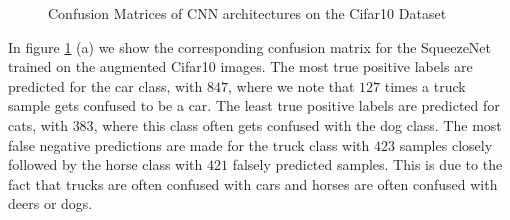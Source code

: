 \documentclass[11pt]{article}
\begin{document}
\begin{figure}
\centering
{}
  \hfill
  \hfill
\caption{Confusion Matrices of CNN architectures on the Cifar10 Dataset}
\label{rescnn::4}
\end{figure}

In figure \ref{rescnn::4} (a) we show the corresponding confusion matrix for the SqueezeNet trained on the augmented Cifar10 images. The most true positive labels are predicted for the car class, with $847$, where we note that $127$ times a truck sample gets confused to be a car. The least true positive labels are predicted for cats, with $383$, where this class often gets confused with the dog class. The most false negative predictions are made for the truck class with $423$ samples closely followed by the horse class with $421$ falsely predicted samples. This is due to the fact that trucks are often confused with cars and horses are often confused with deers or dogs.
\end{document}
